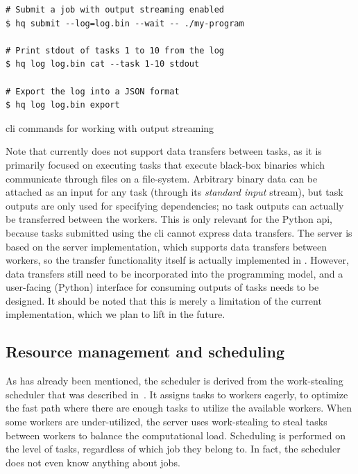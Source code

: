 \begin{listing}[h]
	\begin{verbatim}
# Submit a job with output streaming enabled
$ hq submit --log=log.bin --wait -- ./my-program

# Print stdout of tasks 1 to 10 from the log
$ hq log log.bin cat --task 1-10 stdout

# Export the log into a JSON format
$ hq log log.bin export
	\end{verbatim}
	\caption{\hyperqueue{} \gls{cli} commands for working with output streaming}
	\label{lst:hq-cli-log}
\end{listing}

Note that \hyperqueue{} currently does not support data transfers between tasks, as it is
primarily focused on executing tasks that execute black-box binaries which communicate through
files on a file-system. Arbitrary binary data can be attached as an input for any task (through its
\emph{standard input} stream), but task outputs are only used for specifying dependencies; no
task outputs can actually be transferred between the workers. This is only relevant for the Python
\gls{api}, because tasks submitted using the \gls{cli} cannot express
data transfers. The \hq{} server is based on the \rsds{} server
implementation, which supports data transfers between workers, so the transfer functionality itself
is actually implemented in \hq{}. However, data transfers still need to be
incorporated into the \hyperqueue{} programming model, and a user-facing (Python)
interface for consuming outputs of tasks needs to be designed. It should be noted that this is
merely a limitation of the current implementation, which we plan to lift in the future.

\subsection{Resource management and scheduling}
\label{sec:hq-resource-management}
As has already been mentioned, the \hyperqueue{} scheduler is derived from the
\rsds{} work-stealing scheduler that was described in~. It
assigns tasks to workers eagerly, to optimize the fast path where there are enough tasks to utilize
the available workers. When some workers are under-utilized, the server uses work-stealing to steal
tasks between workers to balance the computational load. Scheduling is performed on the level of
tasks, regardless of which job they belong to. In fact, the scheduler does not even know anything
about jobs.

